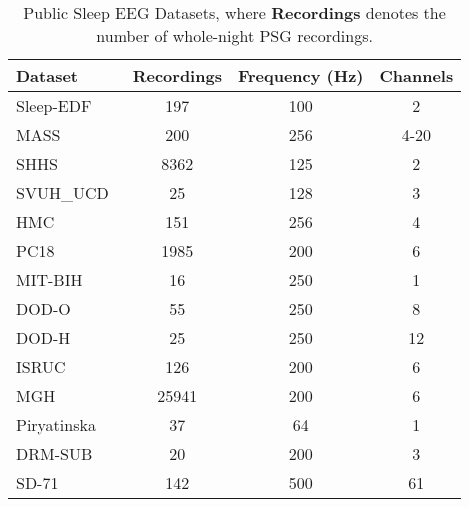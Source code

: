 \begin{table}[t]
\renewcommand{\arraystretch}{1.2}
\caption{Public Sleep EEG Datasets, where \textbf{Recordings} denotes the number of whole-night PSG recordings.}
\label{tab:sleep}
\footnotesize
\centering
\begin{tabular}{lccc}
\hline
\textbf{Dataset}      & \textbf{Recordings}                     & \textbf{Frequency (Hz)} & \textbf{Channels} \\
\hline
Sleep-EDF~\cite{kemp2000analysis,goldberger2000physiobank}             & 197                 & 100          & 2                 \\
MASS~\cite{oreilly2014montreal}                  & 200                 & 256          & 4-20         \\
SHHS~\cite{quan1997sleep,zhang2018national}                  & 8362                     & 125          & 2                 \\
SVUH\_UCD~\cite{ucddb2007sleep,goldberger2000physiobank}              & 25              & 128          & 3                 \\
HMC~\cite{Alvarez-Estevez2022, goldberger2000physiobank} & 151 & 256 & 4\\
PC18~\cite{ghassemi2018you,goldberger2000physiobank}                  & 1985                     & 200          & 6                 \\
MIT-BIH~\cite{ichimaru1999development,goldberger2000physiobank}              & 16                   & 250          & 1                 \\
DOD-O~\cite{dod_dataset}                   & 55                   & 250          & 8                 \\
DOD-H~\cite{dod_dataset}                   & 25                   & 250          & 12                 \\
ISRUC~\cite{khalighi2016isruc}              & 126                      & 200          & 6                 \\
MGH~\cite{biswal2018expert}                  & 25941                   & 200          & 6                 \\
Piryatinska~\cite{piryatinska2009automated}           & 37         & 64           & 1                 \\
DRM-SUB~\cite{devuyst2005dreams} & 20 & 200 & 3 \\
SD-71~\cite{xiang2023resting} & 142 & 500 & 61 \\
\hline
\end{tabular}
\end{table}

